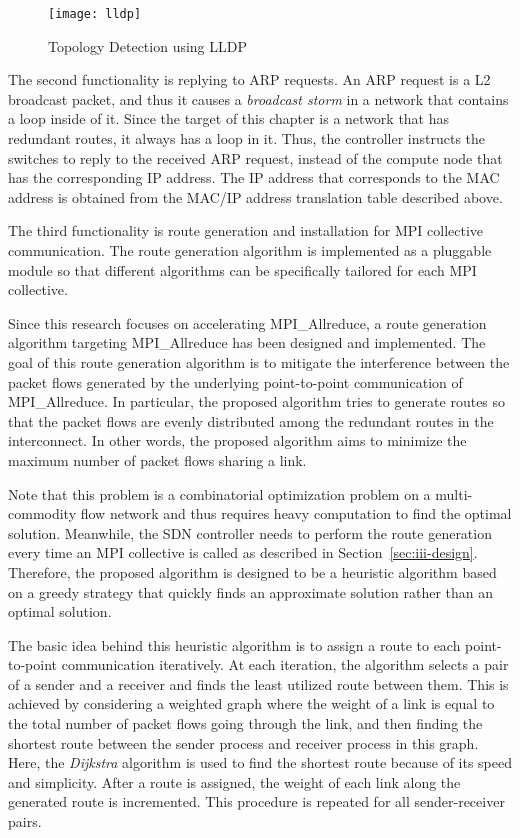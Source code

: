 \begin{figure}
    \centering
    \texttt{[image: lldp]}
    \caption{Topology Detection using LLDP}%
    \label{fig:lldp}
\end{figure}

The second functionality is replying to ARP requests. An ARP request is
a L2 broadcast packet, and thus it causes a \emph{broadcast storm}
in a network that contains a loop inside of it. Since the target of
this chapter is a network that has redundant routes, it always has a loop
in it. Thus, the controller instructs the switches to reply to the
received ARP request, instead of the compute node that has the
corresponding IP address. The IP address that corresponds to the MAC
address is obtained from the MAC/IP address translation table described above.

The third functionality is route generation and installation for MPI
collective communication. The route generation algorithm is implemented as a
pluggable module so that different algorithms can be specifically tailored for
each MPI collective.

Since this research focuses on accelerating MPI\_Allreduce, a route generation
algorithm targeting MPI\_Allreduce has been designed and implemented. The goal
of this route generation algorithm is to mitigate the interference between the
packet flows generated by the underlying point-to-point communication of
MPI\_Allreduce. In particular, the proposed algorithm tries to generate routes
so that the packet flows are evenly distributed among the redundant routes in
the interconnect. In other words, the proposed algorithm aims to minimize the
maximum number of packet flows sharing a link.

Note that this problem is a combinatorial optimization problem on a
multi-commodity flow network and thus requires heavy computation to find the
optimal solution. Meanwhile, the SDN controller needs to perform the route
generation every time an MPI collective is called as described in
Section~\ref{sec:iii-design}. Therefore, the proposed algorithm is designed to
be a heuristic algorithm based on a greedy strategy that quickly finds an
approximate solution rather than an optimal solution.

The basic idea behind this heuristic algorithm is to assign a route to each
point-to-point communication iteratively. At each iteration, the algorithm
selects a pair of a sender and a receiver and finds the least utilized route
between them. This is achieved by considering a weighted graph where the
weight of a link is equal to the total number of packet flows going through
the link, and then finding the shortest route between the sender process and
receiver process in this graph. Here, the \emph{Dijkstra} algorithm is used to
find the shortest route because of its speed and simplicity. After a route is
assigned, the weight of each link along the generated route is incremented.
This procedure is repeated for all sender-receiver pairs.

